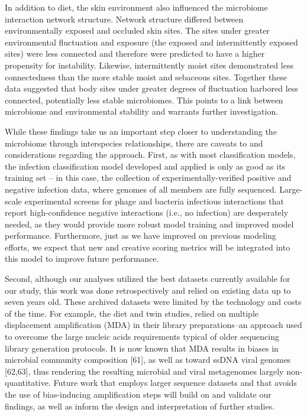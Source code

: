\documentclass[12pt,]{article}
\begin{document}
In addition to diet, the skin environment also influenced the microbiome
interaction network structure. Network structure differed between
environmentally exposed and occluded skin sites. The sites under greater
environmental fluctuation and exposure (the exposed and intermittently
exposed sites) were less connected and therefore were predicted to have
a higher propensity for instability. Likewise, intermittently moist
sites demonstrated less connectedness than the more stable moist and
sebaceous sites. Together these data suggested that body sites under
greater degrees of fluctuation harbored less connected, potentially less
stable microbiomes. This points to a link between microbiome and
environmental stability and warrants further investigation.

While these findings take us an important step closer to understanding
the microbiome through interspecies relationships, there are caveats to
and considerations regarding the approach. First, as with most
classification models, the infection classification model developed and
applied is only as good as its training set -- in this case, the
collection of experimentally-verified positive and negative infection
data, where genomes of all members are fully sequenced. Large-scale
experimental screens for phage and bacteria infectious interactions that
report high-confidence negative interactions (i.e., no infection) are
desperately needed, as they would provide more robust model training and
improved model performance. Furthermore, just as we have improved on
previous modeling efforts, we expect that new and creative scoring
metrics will be integrated into this model to improve future
performance.

Second, although our analyses utilized the best datasets currently
available for our study, this work was done retrospectively and relied
on existing data up to seven years old. These archived datasets were
limited by the technology and costs of the time. For example, the diet
and twin studies, relied on multiple displacement amplification (MDA) in
their library preparations--an approach used to overcome the large
nucleic acids requirements typical of older sequencing library
generation protocols. It is now known that MDA results in biases in
microbial community composition {[}61{]}, as well as toward ssDNA viral
genomes {[}62,63{]}, thus rendering the resulting microbial and viral
metagenomes largely non-quantitative. Future work that employs larger
sequence datasets and that avoids the use of bias-inducing amplification
steps will build on and validate our findings, as well as inform the
design and interpretation of further studies.
\end{document}
